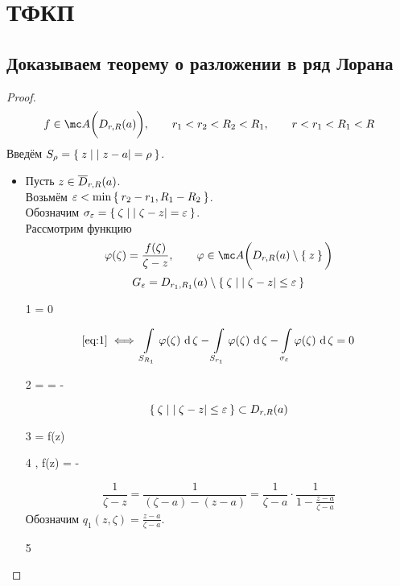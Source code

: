 \chapter{ТФКП}

\section{Доказываем теорему о разложении в ряд Лорана}

\begin{proof}
	$$ f \in \mc A \bigg( D_{r, R}(a) \bigg), \qquad r_1 < r_2 < R_2 < R_1, \qquad r < r_1 < R_1 < R $$
	Введём $ S_\rho = \Set{ z \mid |z - a| = \rho} $.
	\begin{itemize}
		\item Пусть $ z \in \overline D_{r, R}(a) $. \\
		Возьмём $ \varepsilon < \min\Set{ r_2 - r_1, R_1 - R_2} $. \\
		Обозначим $ \sigma_\varepsilon = \Set{\zeta \mid |\zeta - z| = \varepsilon} $. \\
		Рассмотрим функцию
		$$ \vphi(\zeta) = \frac{f(\zeta)}{\zeta - z}, \qquad \vphi \in \mc A \bigg( D_{r, R}(a) \setminus \set{z} \bigg) $$
		$$ G_\varepsilon = D_{r_1, R_1}(a) \setminus \Set{\zeta \mid |\zeta - z| \le \varepsilon} $$
		\begin{equ}1
			 = 0
		\end{equ}
		$$ \eref1 \iff \cint[\zeta]{S_{R_1}}{\vphi(\zeta)} - \cint[\zeta]{S_{r_1}}{\vphi(\zeta)} - \cint[\zeta]{\sigma_\veps}{\vphi(\zeta)} = 0 $$
		\begin{equ}2
			\implies {} =  =  - \cint[\zeta]{S_{r_1}}{\frac{f(\zeta)}{\zeta - z}}
		\end{equ}
		$$ \Set{\zeta \mid |\zeta - z| \le \varepsilon} \subset D_{r, R}(a) $$
		\begin{equ}3
			\cint[\zeta]{\sigma_\veps}{\frac{f(\zeta)}{\zeta - z}} = f(z)
		\end{equ}
		\begin{equ}4
			,  \implies f(z) =   - 
		\end{equ}
		$$ \frac1{\zeta - z} = \frac1{(\zeta - a) - (z - a)} = \frac1{\zeta - a} \cdot \frac1{1 - \frac{z - a}{\zeta - a}} $$
		Обозначим $ q_1(z, \zeta) = \frac{z - a}{\zeta - a} $.
		\begin{equ}5

\end{equ}
\end{itemize}
\end{proof}
